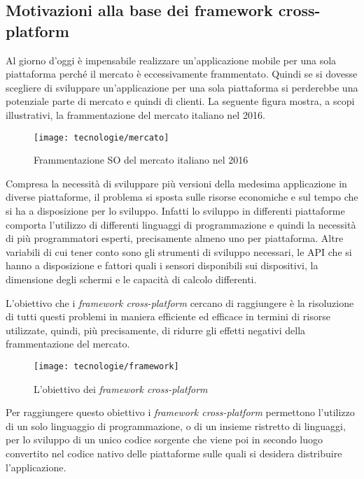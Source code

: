 \subsection{Motivazioni alla base dei framework cross-platform}

Al giorno d'oggi è impensabile realizzare un'applicazione mobile per una sola piattaforma perché il mercato è eccessivamente frammentato. Quindi se si dovesse scegliere di sviluppare un'applicazione per una sola piattaforma si perderebbe una potenziale parte di mercato e quindi di clienti. La seguente figura mostra, a scopi illustrativi, la frammentazione del mercato italiano nel 2016.

\begin{figure}[!h] 
    \centering 
    \texttt{[image: tecnologie/mercato]} 
    \caption{Frammentazione SO del mercato italiano nel 2016}
\end{figure}

Compresa la necessità di sviluppare più versioni della medesima applicazione in diverse piattaforme, il problema si sposta sulle risorse economiche e sul tempo che si ha a disposizione per lo sviluppo. Infatti lo sviluppo in differenti piattaforme comporta l'utilizzo di differenti linguaggi di programmazione e quindi la necessità di più programmatori esperti, precisamente almeno uno per piattaforma. Altre variabili di cui tener conto sono gli strumenti di sviluppo necessari, le API che si hanno a disposizione e fattori quali i sensori disponibili sui dispositivi, la dimensione degli schermi e le capacità di calcolo differenti.

L'obiettivo che i \textit{framework cross-platform} cercano di raggiungere è la risoluzione di tutti questi problemi in maniera efficiente ed efficace in termini di risorse utilizzate, quindi, più precisamente, di ridurre gli effetti negativi della frammentazione del mercato.

\begin{figure}[!h] 
    \centering 
    \texttt{[image: tecnologie/framework]} 
    \caption{L'obiettivo dei \textit{framework cross-platform}}
\end{figure}

Per raggiungere questo obiettivo i \textit{framework cross-platform} permettono l'utilizzo di un solo linguaggio di programmazione, o di un insieme ristretto di linguaggi, per lo sviluppo di un unico codice sorgente che viene poi in secondo luogo convertito nel codice nativo delle piattaforme sulle quali si desidera distribuire l'applicazione. 

